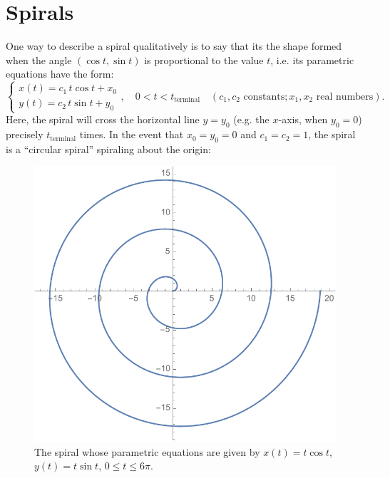 \documentclass[12pt]{article}
\begin{document}
	\section*{Spirals}
	One way to describe a spiral qualitatively is to say that its the shape formed when the angle $(\cos{t},\sin{t})$ is proportional to the value $t$, i.e. its parametric equations have the form:
	\begin{equation}
	\label{eq:spiral}
	\left\{
		\begin{array}{l}
		x(t)=c_1\,t\cos{t}+x_0\\
		y(t)=c_2\,t\sin{t}+y_0
		\end{array}
	\right.,\quad 0 < t < t_{\text{terminal}}\quad(c_1,c_2\text{ constants}; x_1,x_2\text{ real numbers}).\end{equation}
	Here, the spiral will cross the horizontal line $y=y_0$ (e.g. the $x$-axis, when $y_0=0$) precisely $t_{\text{terminal}}$ times. In the event that $x_0=y_0=0$ and $c_1=c_2=1$, the spiral is a ``circular spiral'' spiraling about the origin:
	\begin{figure}[h!]
		\begin{center}
			\includegraphics[trim={0 0 0 0}, clip, scale=0.575]{4_Spirals}
			\caption{The spiral whose parametric equations are given by $x(t)=t\cos{t}$, $y(t)=t\sin{t}$, $0\leq t\leq 6\pi$.}
		\end{center}
	\end{figure}
\end{document}
